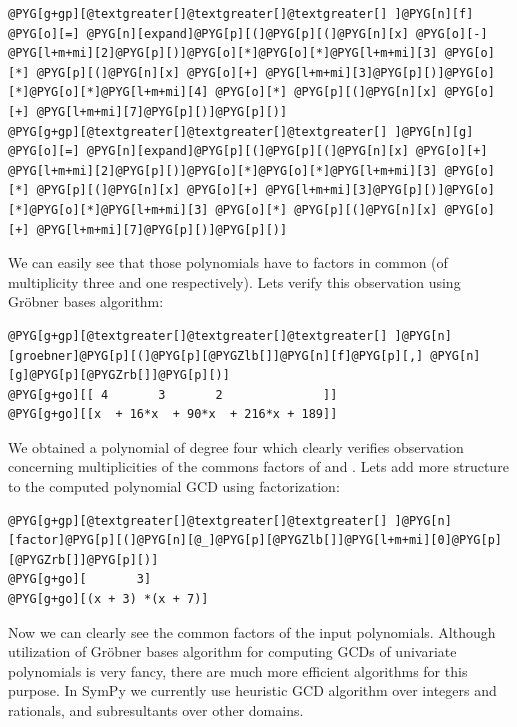 \begin{Verbatim}[commandchars=@\[\]]
@PYG[g+gp][@textgreater[]@textgreater[]@textgreater[] ]@PYG[n][f] @PYG[o][=] @PYG[n][expand]@PYG[p][(]@PYG[p][(]@PYG[n][x] @PYG[o][-] @PYG[l+m+mi][2]@PYG[p][)]@PYG[o][*]@PYG[o][*]@PYG[l+m+mi][3] @PYG[o][*] @PYG[p][(]@PYG[n][x] @PYG[o][+] @PYG[l+m+mi][3]@PYG[p][)]@PYG[o][*]@PYG[o][*]@PYG[l+m+mi][4] @PYG[o][*] @PYG[p][(]@PYG[n][x] @PYG[o][+] @PYG[l+m+mi][7]@PYG[p][)]@PYG[p][)]
@PYG[g+gp][@textgreater[]@textgreater[]@textgreater[] ]@PYG[n][g] @PYG[o][=] @PYG[n][expand]@PYG[p][(]@PYG[p][(]@PYG[n][x] @PYG[o][+] @PYG[l+m+mi][2]@PYG[p][)]@PYG[o][*]@PYG[o][*]@PYG[l+m+mi][3] @PYG[o][*] @PYG[p][(]@PYG[n][x] @PYG[o][+] @PYG[l+m+mi][3]@PYG[p][)]@PYG[o][*]@PYG[o][*]@PYG[l+m+mi][3] @PYG[o][*] @PYG[p][(]@PYG[n][x] @PYG[o][+] @PYG[l+m+mi][7]@PYG[p][)]@PYG[p][)]
\end{Verbatim}
\noindent
We can easily see that those polynomials have to factors in common (of multiplicity three
and one respectively). Lets verify this observation using Gröbner bases algorithm:

\begin{Verbatim}[commandchars=@\[\]]
@PYG[g+gp][@textgreater[]@textgreater[]@textgreater[] ]@PYG[n][groebner]@PYG[p][(]@PYG[p][@PYGZlb[]]@PYG[n][f]@PYG[p][,] @PYG[n][g]@PYG[p][@PYGZrb[]]@PYG[p][)]
@PYG[g+go][[ 4       3       2              ]]
@PYG[g+go][[x  + 16*x  + 90*x  + 216*x + 189]]
\end{Verbatim}
\noindent
We obtained a polynomial of degree four which clearly verifies observation concerning
multiplicities of the commons factors of  and . Lets add more structure to
the computed polynomial GCD using factorization:

\begin{Verbatim}[commandchars=@\[\]]
@PYG[g+gp][@textgreater[]@textgreater[]@textgreater[] ]@PYG[n][factor]@PYG[p][(]@PYG[n][@_]@PYG[p][@PYGZlb[]]@PYG[l+m+mi][0]@PYG[p][@PYGZrb[]]@PYG[p][)]
@PYG[g+go][       3]
@PYG[g+go][(x + 3) *(x + 7)]
\end{Verbatim}
\noindent
Now we can clearly see the common factors of the input polynomials. Although utilization of
Gröbner bases algorithm for computing GCDs of univariate polynomials is very fancy, there
are much more efficient algorithms for this purpose. In SymPy we currently use heuristic GCD
algorithm over integers and rationals, and subresultants over other domains.


